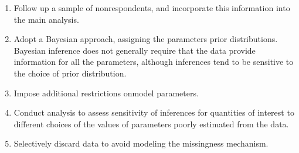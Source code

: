 \begin{enumerate}
    \item Follow up a sample of nonrespondents, and incorporate this information into the main analysis.
    \item Adopt a Bayesian approach, assigning the parameters prior distributions. Bayesian inference does not generally require that the data provide information for all the parameters, although inferences tend to be sensitive to
          the choice of prior distribution.
    \item Impose additional restrictions onmodel parameters.
    \item Conduct analysis to assess sensitivity of inferences for quantities of interest to different choices of the values of parameters poorly estimated from the data.
    \item Selectively discard data to avoid modeling the missingness mechanism.
\end{enumerate}